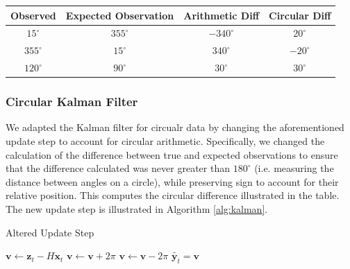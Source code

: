 \documentclass[11pt]{amsart}
\begin{document}
\begin{center}
    \begin{tabular}{||c c c c||}
     \hline
     Observed & Expected Observation & Arithmetic Diff & Circular Diff \\ 
     \hline\hline
     $15^{\circ}$ & $355^{\circ}$ & $-340^{\circ}$ & $20^{\circ}$ \\ 
     \hline
     $355^{\circ}$ & $15^{\circ}$ &  $340^{\circ}$ & $-20^{\circ}$ \\
     \hline
     $120^{\circ}$ & $90^{\circ}$ & $30^{\circ}$ & $30^{\circ}$ \\ [1ex] 
     \hline
    \end{tabular}
    \end{center}



\subsubsection{Circular Kalman Filter}
We adapted the Kalman filter for circualr data by changing the aforementioned update step to account for circular arithmetic. Specifically, we changed the calculation of the difference between true and expected observations to ensure that the difference calculated was never greater than $180^{\circ}$ (i.e. measuring the distance between angles on a circle), while preserving sign to account for their relative position. This computes the circular difference illustrated in the table. The new update step is illustrated in Algorithm \ref{alg:kalman}.


\begin{algorithm}
    \caption{Altered Update Step}\label{alg:kalman}    
    \begin{algorithmic}
        \State $\mathbf{v} \gets \mathbf{z}_t - H\mathbf{x}_t$
            \State $\mathbf{v} \gets \mathbf{v} + 2\pi$
            \State $\mathbf{v} \gets \mathbf{v} - 2\pi$
        \EndIf 
        \State $\tilde{\mathbf{y}_t} = \mathbf{v}$ 
        \end{algorithmic}
    \end{algorithm}

\end{document}
